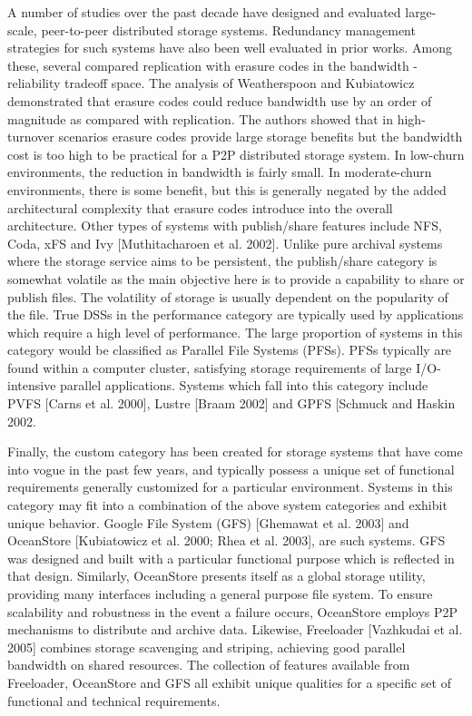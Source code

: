 \documentclass[11pt]{article}
\begin{document}
A number of studies over the past decade have designed and evaluated large-
scale, peer-to-peer distributed storage systems. Redundancy management 
strategies for such systems have also been well evaluated in prior works. 
Among these, several compared replication with erasure codes in the bandwidth
-reliability tradeoff space. The analysis of Weatherspoon and Kubiatowicz 
demonstrated that erasure codes could reduce bandwidth use by an order of 
magnitude as compared with replication. The authors showed that in high-
turnover scenarios erasure codes provide large storage benefits but the 
bandwidth cost is too high to be practical for a P2P distributed storage 
system. In low-churn environments, the reduction in bandwidth is fairly 
small. In moderate-churn environments, there is some benefit, but this is 
generally negated by the added architectural complexity that erasure codes 
introduce into the overall architecture. Other types of systems with 
publish/share features include NFS, Coda, xFS and Ivy 
[Muthitacharoen et al. 2002]. Unlike pure archival systems where the storage 
service aims to be persistent, the publish/share category is somewhat 
volatile as the main objective here is to provide a capability to share or 
publish files. The volatility of storage is usually dependent on the 
popularity of the file. True DSSs in the performance category are typically 
used by applications which require a high level of performance. The large 
proportion of systems in this category would be classified as Parallel File 
Systems (PFSs).  PFSs typically are found within a computer cluster, 
satisfying storage requirements of large I/O-intensive parallel applications.  
Systems which fall into this category include PVFS [Carns et al. 2000], 
Lustre [Braam 2002] and GPFS [Schmuck and Haskin 2002.

Finally, the custom category has been created for storage systems that have 
come into vogue in the past few years, and typically possess a unique set 
of functional requirements generally customized for a particular environment. 
Systems in this category may fit into a combination of the above system 
categories and exhibit unique behavior. Google File System (GFS) 
[Ghemawat et al. 2003] and OceanStore [Kubiatowicz et al. 2000; Rhea 
et al. 2003], are such systems. GFS was designed and built with a particular 
functional purpose which is reflected in that design. Similarly, OceanStore 
presents itself as a global storage utility, providing many interfaces 
including a general purpose file system. To ensure scalability and robustness 
in the event a failure occurs, OceanStore employs P2P mechanisms to distribute 
and archive data. Likewise, Freeloader [Vazhkudai et al. 2005] combines 
storage scavenging and striping, achieving good parallel bandwidth on shared 
resources. The collection of features available from Freeloader, OceanStore 
and GFS all exhibit unique qualities for a specific set of functional and 
technical requirements.
\end{document}
